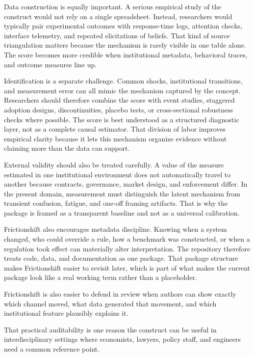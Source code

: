 \documentclass[12pt]{article}
\begin{document}
Data construction is equally important. A serious empirical study of the construct would not rely on a single spreadsheet. Instead, researchers would typically pair experimental outcomes with response-time logs, attention checks, interface telemetry, and repeated elicitations of beliefs. That kind of source triangulation matters because the mechanism is rarely visible in one table alone. The score becomes more credible when institutional metadata, behavioral traces, and outcome measures line up.

Identification is a separate challenge. Common shocks, institutional transitions, and measurement error can all mimic the mechanism captured by the concept. Researchers should therefore combine the score with event studies, staggered adoption designs, discontinuities, placebo tests, or cross-sectional robustness checks where possible. The score is best understood as a structured diagnostic layer, not as a complete causal estimator. That division of labor improves empirical clarity because it lets this mechanism organize evidence without claiming more than the data can support.

External validity should also be treated carefully. A value of the measure estimated in one institutional environment does not automatically travel to another because contracts, governance, market design, and enforcement differ. In the present domain, measurement must distinguish the latent mechanism from transient confusion, fatigue, and one-off framing artifacts. That is why the package is framed as a transparent baseline and not as a universal calibration.

Frictionshift also encourages metadata discipline. Knowing when a system changed, who could override a rule, how a benchmark was constructed, or when a regulation took effect can materially alter interpretation. The repository therefore treats code, data, and documentation as one package. That package structure makes Frictionshift easier to revisit later, which is part of what makes the current package look like a real working term rather than a placeholder.

Frictionshift is also easier to defend in review when authors can show exactly which channel moved, what data generated that movement, and which institutional feature plausibly explains it.

That practical auditability is one reason the construct can be useful in interdisciplinary settings where economists, lawyers, policy staff, and engineers need a common reference point.
\end{document}
